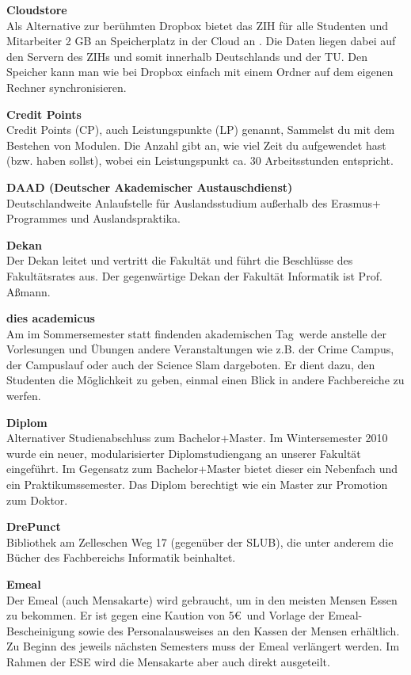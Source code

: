 \begin{multicols}{2}
\textbf{Cloudstore} \\
Als Alternative zur berühmten Dropbox bietet das ZIH für alle Studenten und Mitarbeiter 2 GB an Speicherplatz in der Cloud an . Die Daten liegen dabei auf den Servern des ZIHs und somit innerhalb Deutschlands und der TU. Den Speicher kann man wie bei Dropbox einfach mit einem Ordner auf dem eigenen Rechner synchronisieren.

\textbf{Credit Points} \\
Credit Points (CP), auch Leistungspunkte (LP) genannt, Sammelst du mit dem Bestehen von Modulen.
Die Anzahl gibt an, wie viel Zeit du aufgewendet hast (bzw. haben sollst), wobei ein Leistungspunkt ca. 30 Arbeitsstunden entspricht.

\textbf{DAAD (Deutscher Akademischer Austauschdienst)} \\
Deutschlandweite Anlaufstelle für Auslandsstudium außerhalb des Erasmus+ Programmes und Auslands\-praktika.

\textbf{Dekan} \\
Der Dekan leitet und vertritt die Fakultät und führt die Beschlüsse des Fakultätsrates aus.
Der gegenwärtige Dekan der Fakultät Informatik ist Prof. Aßmann.

\textbf{dies academicus} \\
Am im Sommersemester statt findenden \glqq akademischen Tag\grqq\ werde anstelle der Vorlesungen und Übungen andere Veranstaltungen wie z.B. der Crime Campus, der Campuslauf oder auch der Science Slam dargeboten.
Er dient dazu, den Studenten die Möglichkeit zu geben, einmal einen Blick in andere Fachbereiche zu werfen. 

\vfill\columnbreak

\textbf{Diplom} \\
Alternativer Studienabschluss zum Bachelor+Master.
Im Wintersemester 2010 wurde ein neuer, modularisierter Diplomstudiengang an unserer Fakultät eingeführt.
Im Gegensatz zum Bachelor+Master bietet dieser ein Nebenfach und ein Praktikumssemester.
Das Diplom berechtigt wie ein Master zur Promotion zum Doktor.

\textbf{DrePunct} \\
Bibliothek am Zelleschen Weg 17 (gegenüber der SLUB), die unter anderem die Bücher des Fachbereichs Informatik beinhaltet.

\textbf{Emeal} \\
Der Emeal (auch Mensakarte) wird gebraucht, um in den meisten Mensen Essen zu bekommen.
Er ist gegen eine Kaution von 5\euro\ und Vorlage der Emeal-Bescheinigung sowie des Personalausweises an den Kassen der Mensen erhältlich.
Zu Beginn des jeweils nächsten Semesters muss der Emeal verlängert werden.
Im Rahmen der ESE wird die Mensakarte aber auch direkt ausgeteilt.


\end{multicols}
